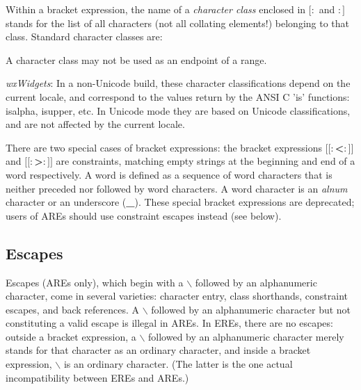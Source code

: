 Within a bracket expression,
the name of a {\it character class} enclosed in {\bf $[:$} and {\bf $:]$} stands for the list
of all characters (not all collating elements!) belonging to that class.
Standard character classes are:

\begin{twocollist}\twocolwidtha{3cm}
\end{twocollist}

A character class may not be used as an endpoint of a range. 

{\it wxWidgets}: In a non-Unicode build, these character classifications depend on the
current locale, and correspond to the values return by the ANSI C 'is'
functions: isalpha, isupper, etc. In Unicode mode they are based on
Unicode classifications, and are not affected by the current locale.

There are two special cases of bracket expressions:
the bracket expressions {\bf $[[:$<$:]]$} and {\bf $[[:$>$:]]$} are constraints, matching empty
strings at the beginning and end of a word respectively.  A word is defined
as a sequence of word characters that is neither preceded nor followed
by word characters. A word character is an {\it alnum} character or an underscore
({\bf \_}). These special bracket expressions are deprecated; users of AREs should
use constraint escapes instead (see  below). 

\subsection{Escapes}\label{wxresynescapes}


Escapes (AREs only),
which begin with a {\bf $\backslash$} followed by an alphanumeric character, come in several
varieties: character entry, class shorthands, constraint escapes, and back
references. A {\bf $\backslash$} followed by an alphanumeric character but not constituting
a valid escape is illegal in AREs. In EREs, there are no escapes: outside
a bracket expression, a {\bf $\backslash$} followed by an alphanumeric character merely stands
for that character as an ordinary character, and inside a bracket expression,
 {\bf $\backslash$} is an ordinary character. (The latter is the one actual incompatibility
between EREs and AREs.) 


